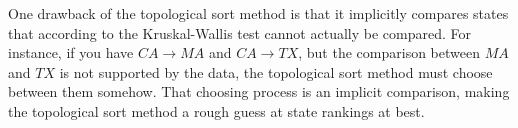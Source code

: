 One drawback of the topological sort method is that it implicitly compares states that according to the Kruskal-Wallis test cannot actually be compared. For instance, if you have $CA\rightarrow MA$ and $CA\rightarrow TX$, but the comparison between $MA$ and $TX$ is not supported by the data, the topological sort method must choose between them somehow. That choosing process is an implicit comparison, making the topological sort method a rough guess at state rankings at best.
